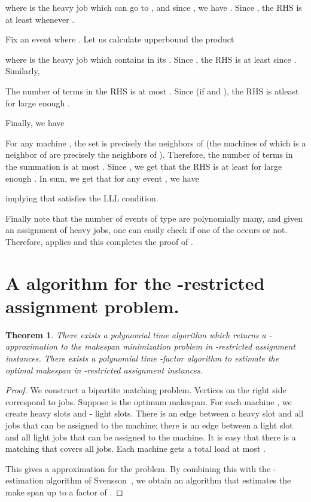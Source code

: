 \documentclass[11pt]{article}
\newtheorem{theorem}{Theorem} \newtheorem{lemma}{Lemma}[section]
\begin{document}
\else

\fi
where  is the heavy job which can go to , and since , we have . Since , the RHS is at least  whenever .


Fix an event  where . Let us calculate upperbound the product
\ifdefined\CR

\else

\fi
where  is the heavy job which contains  in its . Since , the RHS is at least  since .
Similarly, 
\ifdefined\CR

\else

\fi
The number of terms in the RHS is at most . Since  (if  and ), the RHS is atleast  for large enough .

Finally, we have
\ifdefined\CR

\else

\fi
For any machine , the set  is precisely the neighbors of  (the machines of which  is a neighbor of are precisely the neighbors of ). Therefore, the number of terms in the summation is at most 
. Since , we get that the RHS is at least  for large enough . In sum, we get that for any event , we have
\ifdefined\CR

\else

\fi
implying that  satisfies the LLL condition. 

Finally note that the number of events of type  are polynomially many, and given an assignment of heavy jobs, one can easily check if one of the  occurs or not. Therefore,  applies  
and this completes the proof of .




\appendix
\section{A \texorpdfstring{}{2-epsilon} algorithm for the \texorpdfstring{}{(1,epsilon)}-restricted assignment problem.}
\label{app:large-eps}

\begin{theorem}
There exists a polynomial time algorithm which returns a -approximation to the makespan minimization problem in -restricted assignment instances. There exists a polynomial time -factor algorithm to estimate the optimal makespan in -restricted assignment instances.
\end{theorem}
\begin{proof}
We construct a bipartite matching problem. Vertices on the right side correspond to jobs. Suppose  is the optimum makespan.  For each machine , we create  heavy slots and   -  light slots. There is an edge between a heavy slot and all jobs that can be assigned to the machine; there is an edge between a light slot and all light jobs that can be assigned to the machine. It is easy that there is a matching that covers all jobs. Each machine gets a total load at most .

This gives a  approximation for the problem. By combining this with the -estimation algorithm of Svensson~\cite{Sve11}, we obtain an algorithm that estimates the make span  up to a factor of .

\end{proof}
\end{document}
